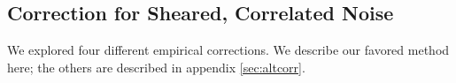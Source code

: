 \documentclass[a4paper,fleqn,usenatbib]{mnras}
\newcommand{\mcalR}{$R$}
\newcommand{\mcalRpsf}{$R^{p}$}
\newcommand{\galsim}{\texttt{GALSIM}}
\begin{document}


\subsection{Correction for Sheared, Correlated Noise} \label{sec:fixnoise}

We explored four different empirical corrections.  We describe our favored
method here; the others are described in appendix \ref{sec:altcorr}.

\end{document}
